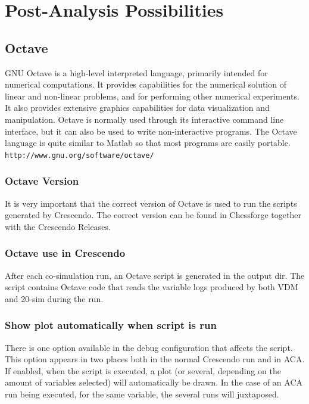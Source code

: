 \documentclass{crescendorepchap}
\newcommand{\url}[1]{\texttt{#1}}
\begin{document}
\chapter{Post-Analysis Possibilities}\label{chap:postana}

\section{Octave}

GNU Octave is a high-level interpreted language, primarily intended for
numerical computations. It provides capabilities for the numerical
solution of linear and non-linear problems, and for performing other
numerical experiments. It also provides extensive graphics capabilities
for data visualization and manipulation. Octave is normally used through
its interactive command line interface, but it can also be used to write
non-interactive programs. The Octave language is quite similar to Matlab
so that most programs are easily portable.
\url{http://www.gnu.org/software/octave/}

\subsection{Octave Version}

It is very important that the correct version of Octave is used to run
the scripts generated by Crescendo. The correct version can be found in
Chessforge together with the Crescendo Releases.

\subsection{Octave use in Crescendo}

After each co-simulation run, an Octave script is generated in the
output dir. The script contains Octave code that reads the variable logs
produced by both VDM and 20-sim during the run.

\subsection{Show plot automatically when script is run}

There is one option available in the debug configuration that affects
the script. This option appears in two places both in the normal Crescendo
run and in ACA. If enabled, when the script is executed, a plot (or
several, depending on the amount of variables selected) will
automatically be drawn. In the case of an ACA run being executed, for
the same variable, the several runs will juxtaposed.
\end{document}
